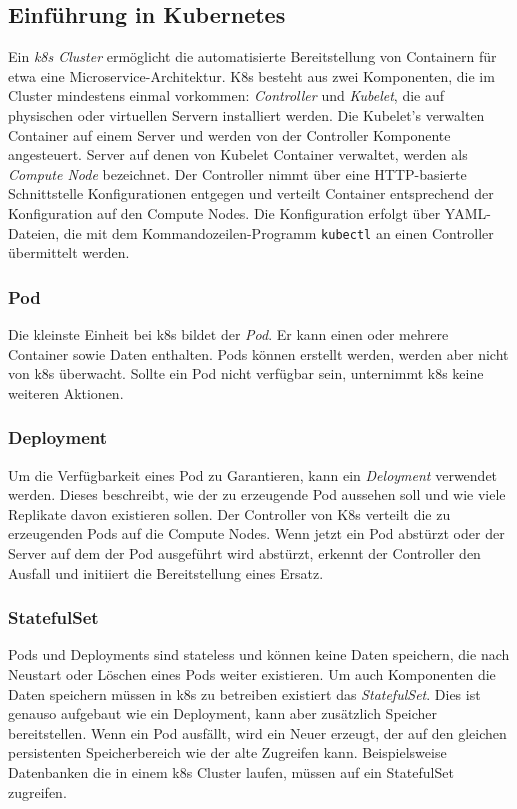 \subsection{Einführung in Kubernetes}

Ein \textit{\ac{k8s} Cluster} ermöglicht die automatisierte Bereitstellung von Containern für etwa eine Microservice-Architektur.
K8s besteht aus zwei Komponenten, die im Cluster mindestens einmal vorkommen: \textit{Controller} und \textit{Kubelet}, die auf physischen oder virtuellen Servern installiert werden.
Die Kubelet's verwalten Container auf einem Server und werden von der Controller Komponente angesteuert.
Server auf denen von Kubelet Container verwaltet, werden als \textit{Compute Node} bezeichnet.
Der Controller nimmt über eine HTTP-basierte Schnittstelle Konfigurationen entgegen und verteilt Container entsprechend der Konfiguration auf den Compute Nodes.
Die Konfiguration erfolgt über YAML-Dateien, die mit dem Kommandozeilen-Programm \texttt{kubectl} an einen Controller übermittelt werden.

\subsubsection{Pod}
Die kleinste Einheit bei \ac{k8s} bildet der \textit{Pod}.
Er kann einen oder mehrere Container sowie Daten enthalten.
Pods können erstellt werden, werden aber nicht von \ac{k8s} überwacht.
Sollte ein Pod nicht verfügbar sein, unternimmt \ac{k8s} keine weiteren Aktionen.

\subsubsection{Deployment}
Um die Verfügbarkeit eines Pod zu Garantieren, kann ein \textit{Deloyment} verwendet werden.
Dieses beschreibt, wie der zu erzeugende Pod aussehen soll und wie viele Replikate davon existieren sollen.
Der Controller von K8s verteilt die zu erzeugenden Pods auf die Compute Nodes.
Wenn jetzt ein Pod abstürzt oder der Server auf dem der Pod ausgeführt wird abstürzt, erkennt der Controller den Ausfall und initiiert die Bereitstellung eines Ersatz.

\subsubsection{StatefulSet}
Pods und Deployments sind stateless und können keine Daten speichern, die nach Neustart oder Löschen eines Pods weiter existieren.
Um auch Komponenten die Daten speichern müssen in \ac{k8s} zu betreiben existiert das \textit{StatefulSet}.
Dies ist genauso aufgebaut wie ein Deployment, kann aber zusätzlich Speicher bereitstellen.
Wenn ein Pod ausfällt, wird ein Neuer erzeugt, der auf den gleichen persistenten Speicherbereich wie der alte Zugreifen kann.
Beispielsweise Datenbanken die in einem \ac{k8s} Cluster laufen, müssen auf ein StatefulSet zugreifen.

